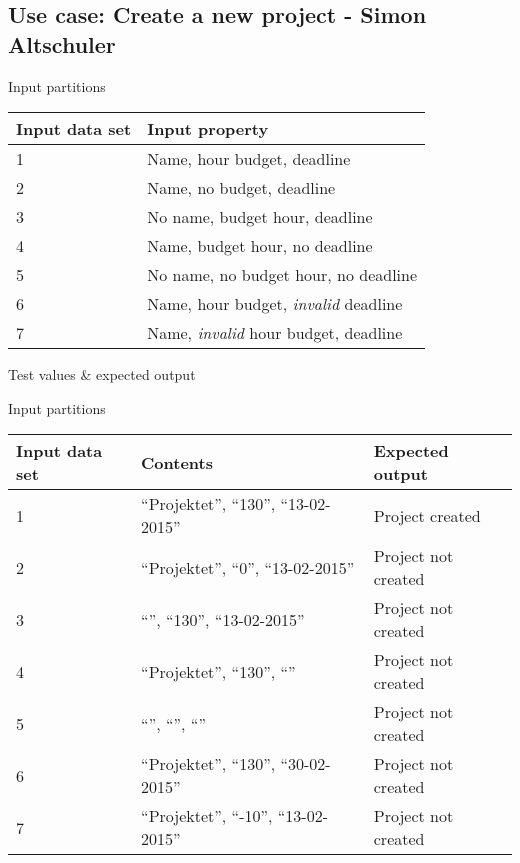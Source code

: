 \subsection{Use case: Create a new project - Simon Altschuler}

Input partitions
\begin{center}
  \begin{tabular}{| l | l |}
    \hline
	Input data set & Input property \\ \hline
     1  & Name, hour budget, deadline \\ \hline
     2  & Name, no budget, deadline \\ \hline
     3  & No name, budget hour, deadline \\ \hline
     4  & Name, budget hour, no deadline \\ \hline
     5  & No name, no budget hour, no deadline \\ \hline
     6  & Name, hour budget, \emph{invalid} deadline \\ \hline
     7  & Name, \emph{invalid} hour budget, deadline \\ \hline
  \end{tabular}
\end{center}

Test values \& expected output

Input partitions
\begin{center}
  \begin{tabular}{| l | l | l |}
    \hline
	Input data set & Contents & Expected output \\ \hline
     1  & ``Projektet'', ``130'', ``13-02-2015'' & Project created  \\ \hline
     2  & ``Projektet'', ``0'', ``13-02-2015'' & Project not created  \\ \hline
     3  & ``'', ``130'', ``13-02-2015'' & Project not created  \\ \hline
     4  & ``Projektet'', ``130'', ``'' & Project not created  \\ \hline
     5  & ``'', ``'', ``'' & Project not created  \\ \hline
     6  & ``Projektet'', ``130'', ``30-02-2015'' & Project not created  \\ \hline
     7  & ``Projektet'', ``-10'', ``13-02-2015'' & Project not created  \\ \hline
  \end{tabular}
\end{center}